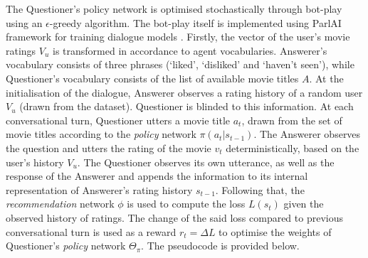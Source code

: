 The Questioner’s policy network is optimised stochastically through bot-play using an $\epsilon$-greedy algorithm. The bot-play itself is implemented using ParlAI framework for training dialogue models \citep{miller2017parlai}. Firstly, the vector of the user’s movie ratings $V_u$ is transformed in accordance to agent vocabularies. Answerer’s vocabulary consists of three phrases (‘liked’, ‘disliked’ and ‘haven’t seen’), while Questioner’s vocabulary consists of the list of available movie titles $A$. At the initialisation of the dialogue, Answerer observes a rating history of a random user $V_u$ (drawn from the dataset). Questioner is blinded to this information. At each conversational turn, Questioner utters a movie title $a_t$, drawn from the set of movie titles according to the \textit{policy} network $\pi(a_t \vert s_{t-1})$. The Answerer observes the question and utters the rating of the movie $v_t$ deterministically, based on the user’s history $V_u$. The Questioner observes its own utterance, as well as the response of the Answerer and appends the information to its internal representation of Answerer’s rating history $s_{t-1}$. Following that, the \textit{recommendation} network $\phi$ is used to compute the loss $L(s_t)$ given the observed history of ratings. The change of the said loss compared to previous conversational turn is used as a reward $r_t = \Delta L$  to optimise the weights of Questioner’s \textit{policy} network $\Theta_{\pi}$. The pseudocode is provided below.

\begin{algorithm}
    \caption{Bot-Play Training Procedure}
    \label{algo:algo_bot_play}
    \begin{algorithmic}[1]
        \Statex
        \Else 
        \EndIf
        \EndFor
        \State \Return {$\Theta$}
    \end{algorithmic}
\end{algorithm}



